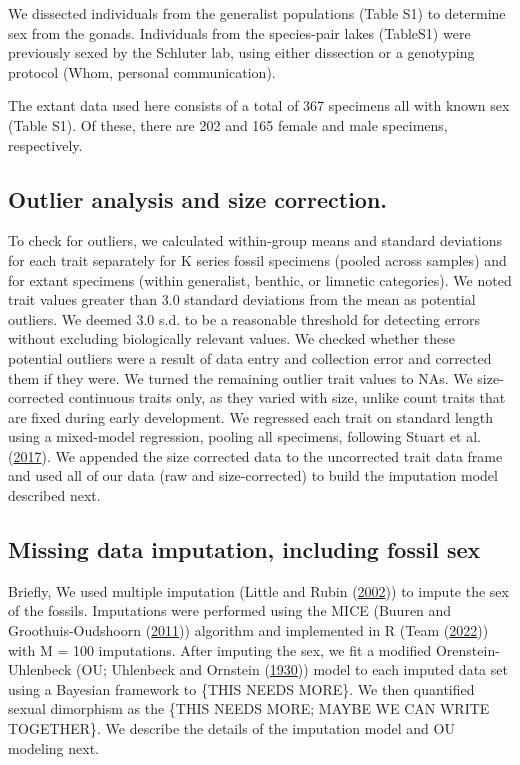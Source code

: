 \documentclass[
  12pt,
]{article}
\begin{document}
We dissected individuals from the generalist populations (Table S1) to
determine sex from the gonads. Individuals from the species-pair lakes
(TableS1) were previously sexed by the Schluter lab, using either
dissection or a genotyping protocol (Whom, personal communication).

The extant data used here consists of a total of 367 specimens all with
known sex (Table S1). Of these, there are 202 and 165 female and male
specimens, respectively.

\hypertarget{outlier-analysis-and-size-correction.}{%
\subsection{Outlier analysis and size
correction.}\label{outlier-analysis-and-size-correction.}}

To check for outliers, we calculated within-group means and standard
deviations for each trait separately for K series fossil specimens
(pooled across samples) and for extant specimens (within generalist,
benthic, or limnetic categories). We noted trait values greater than 3.0
standard deviations from the mean as potential outliers. We deemed 3.0
s.d. to be a reasonable threshold for detecting errors without excluding
biologically relevant values. We checked whether these potential
outliers were a result of data entry and collection error and corrected
them if they were. We turned the remaining outlier trait values to NAs.
We size-corrected continuous traits only, as they varied with size,
unlike count traits that are fixed during early development. We
regressed each trait on standard length using a mixed-model regression,
pooling all specimens, following Stuart et al.
(\protect\hyperlink{ref-Stuartetal2017}{2017}). We appended the size
corrected data to the uncorrected trait data frame and used all of our
data (raw and size-corrected) to build the imputation model described
next.

\hypertarget{missing-data-imputation-including-fossil-sex}{%
\subsection{Missing data imputation, including fossil
sex}\label{missing-data-imputation-including-fossil-sex}}

Briefly, We used multiple imputation (Little and Rubin
(\protect\hyperlink{ref-little2002statistical}{2002})) to impute the sex
of the fossils. Imputations were performed using the MICE (Buuren and
Groothuis-Oudshoorn (\protect\hyperlink{ref-MICE}{2011})) algorithm and
implemented in R (Team (\protect\hyperlink{ref-R2022language}{2022}))
with M = 100 imputations. After imputing the sex, we fit a modified
Orenstein-Uhlenbeck (OU; Uhlenbeck and Ornstein
(\protect\hyperlink{ref-OUProcess}{1930})) model to each imputed data
set using a Bayesian framework to \{THIS NEEDS MORE\}. We then
quantified sexual dimorphism as the \{THIS NEEDS MORE; MAYBE WE CAN
WRITE TOGETHER\}. We describe the details of the imputation model and OU
modeling next.
\end{document}
